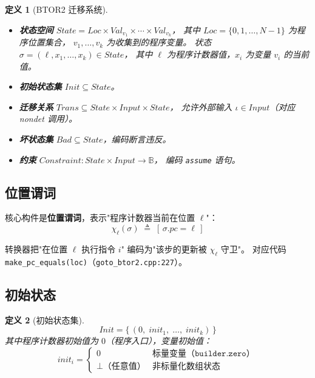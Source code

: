 \documentclass[11pt,a4paper]{article}
\newtheorem{definition}{定义}[section]
\newcommand{\Loc}{\mathit{Loc}}
\newcommand{\State}{\mathit{State}}
\newcommand{\Val}{\mathit{Val}}
\newcommand{\Input}{\mathit{Input}}
\newcommand{\Init}{\mathit{Init}}
\newcommand{\Trans}{\mathit{Trans}}
\newcommand{\Bad}{\mathit{Bad}}
\newcommand{\Cons}{\mathit{Constraint}}
\newcommand{\guard}{\chi}
\begin{document}
\begin{definition}[BTOR2 迁移系统]
  \hfill
  \begin{itemize}
    \item \textbf{状态空间} $\State = \Loc \times \Val_{v_1} \times \cdots \times \Val_{v_k}$，
          其中 $\Loc = \{0, 1, \ldots, N{-}1\}$ 为程序位置集合，
          $v_1, \ldots, v_k$ 为收集到的程序变量。
          状态 $\sigma = (\ell, x_1, \ldots, x_k) \in \State$，
          其中 $\ell$ 为程序计数器值，$x_i$ 为变量 $v_i$ 的当前值。
    \item \textbf{初始状态集} $\Init \subseteq \State$。
    \item \textbf{迁移关系} $\Trans \subseteq \State \times \Input \times \State$，
          允许外部输入 $\iota \in \Input$（对应 nondet 调用）。
    \item \textbf{坏状态集} $\Bad \subseteq \State$，编码断言违反。
    \item \textbf{约束} $\Cons : \State \times \Input \to \mathbb{B}$，
          编码 \texttt{assume} 语句。
  \end{itemize}
\end{definition}

\subsection{位置谓词}

核心构件是\textbf{位置谓词}，表示"程序计数器当前在位置 $\ell$"：
\begin{equation}
  \guard_\ell(\sigma) \;\triangleq\; [\,\sigma.\mathit{pc} = \ell\,]
\end{equation}

转换器把"在位置 $\ell$ 执行指令 $i$" 编码为"该步的更新被 $\guard_\ell$ 守卫"。
对应代码 \texttt{make\_pc\_equals(loc)}（\texttt{goto\_btor2.cpp:227}）。

\subsection{初始状态}

\begin{definition}[初始状态集]
  \[
    \Init = \{\, (0,\;\mathit{init}_1,\;\ldots,\;\mathit{init}_k) \,\}
  \]
  其中程序计数器初始值为 $0$（程序入口），变量初始值：
  \[
    \mathit{init}_i =
    \begin{cases}
      0 & \text{标量变量（} \texttt{builder.zero} \text{）} \\
      \bot \text{（任意值）} & \text{非标量化数组状态}
    \end{cases}
  \]
\end{definition}
\end{document}
